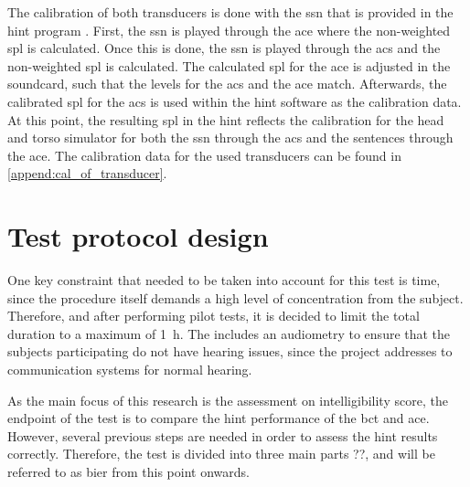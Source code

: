 The calibration of both transducers is done with the \gls{ssn} that is provided in the \gls{hint} program \citep{nilsson_95}. First, the \gls{ssn} is played through the \gls{ace} where the non-weighted \gls{spl} is calculated. Once this is done, the \gls{ssn} is played through the \gls{acs} and the non-weighted \gls{spl} is calculated. The calculated \gls{spl} for the \gls{ace} is adjusted in the soundcard, such that the levels for the \gls{acs} and the \gls{ace} match. Afterwards, the calibrated \gls{spl} for the \gls{acs} is used within the \gls{hint} software as the calibration data. At this point, the resulting \gls{spl}  in the \gls{hint} reflects the calibration for the head and torso simulator for both the \gls{ssn} through the \gls{acs} and the sentences through the \gls{ace}. The calibration data for the used transducers can be found in \autoref{append:cal_of_transducer}.
   
   
   
\section{Test protocol design}
\label{sec:test_protocol_design}   
One key constraint that needed to be taken into account for this test is time, since the procedure itself demands a high level of concentration from the subject. Therefore, and after performing pilot tests, it is decided to limit the total duration to a maximum of \SI{1}{\hour}. The includes an audiometry to ensure that the subjects participating do not have hearing issues, since the project addresses to communication systems for normal hearing.
 
As the main focus of this research is the assessment on intelligibility score, the endpoint of the test is to compare the \gls{hint} performance of the \gls{bct} and \gls{ace}. However, several previous steps are needed in order to assess the \gls{hint} results correctly. Therefore, the test is divided into three main parts ??, and will be referred to as \gls{bier} from this point onwards. 
 
 
 
